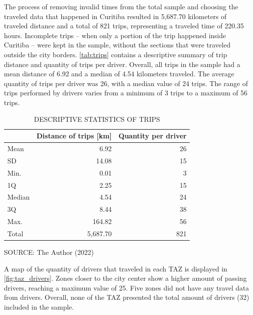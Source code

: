 The process of removing invalid times from the total sample and choosing the traveled data that happened in Curitiba resulted in 5,687.70 kilometers of traveled distance and a total of 821 trips, representing a traveled time of 220.35 hours. Incomplete trips – when only a portion of the trip happened inside Curitiba – were kept in the sample, without the sections that were traveled outside the city borders. \autoref{tab:trips} contains a descriptive summary of trip distance and quantity of trips per driver. Overall, all trips in the sample had a mean distance of 6.92 and a median of 4.54 kilometers traveled. The average quantity of trips per driver was 26, with a median value of 24 trips. The range of trips performed by drivers varies from a minimum of 3 trips to a maximum of 56 trips. 

\begin{table}[!htbp]
    \footnotesize
    \captionsetup{justification=raggedright, singlelinecheck=false,
    font=footnotesize}
    \caption{DESCRIPTIVE STATISTICS OF TRIPS}
    \centering
    \begin{tabular}{lrr}
        \hline
         & \multicolumn{1}{c}{\textbf{Distance of trips [km]}} & \multicolumn{1}{c}{\textbf{Quantity per driver}} \\
        \hline
        Mean   &     6.92 & 26 \\
        SD     &    14.08 & 15 \\
        Min.   &     0.01 &  3 \\
        1Q     &     2.25 & 15 \\
        Median &     4.54 & 24 \\
        3Q     &     8.44 & 38 \\
        Max.   &   164.82 & 56 \\
        \hline
        Total  & 5,687.70 & 821 \\
        \hline
    \end{tabular}
    \label{tab:trips}
    \par \vspace{2mm} \footnotesize \raggedright
    SOURCE: The Author (2022)
\end{table}

A map of the quantity of drivers that traveled in each TAZ is displayed in \autoref{fig:taz_drivers}. Zones closer to the city center show a higher amount of passing drivers, reaching a maximum value of 25. Five zones did not have any travel data from drivers. Overall, none of the TAZ presented the total amount of drivers (32) included in the sample.

